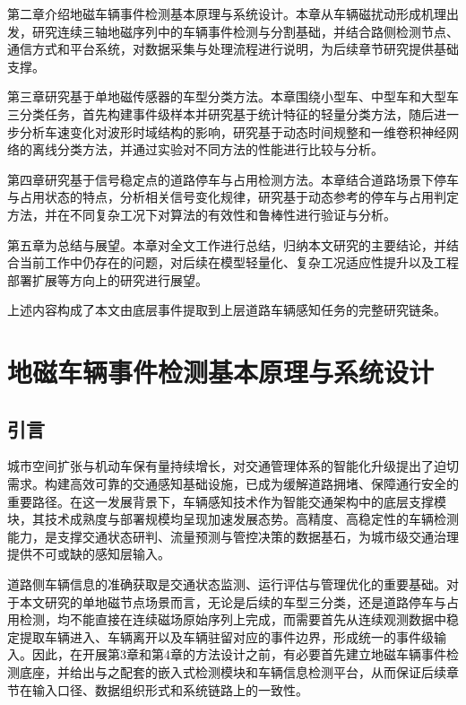 \documentclass{xdupgthesis}
\begin{document}
第二章介绍地磁车辆事件检测基本原理与系统设计。本章从车辆磁扰动形成机理出发，研究连续三轴地磁序列中的车辆事件检测与分割基础，并结合路侧检测节点、通信方式和平台系统，对数据采集与处理流程进行说明，为后续章节研究提供基础支撑。

第三章研究基于单地磁传感器的车型分类方法。本章围绕小型车、中型车和大型车三分类任务，首先构建事件级样本并研究基于统计特征的轻量分类方法，随后进一步分析车速变化对波形时域结构的影响，研究基于动态时间规整和一维卷积神经网络的离线分类方法，并通过实验对不同方法的性能进行比较与分析。

第四章研究基于信号稳定点的道路停车与占用检测方法。本章结合道路场景下停车与占用状态的特点，分析相关信号变化规律，研究基于动态参考的停车与占用判定方法，并在不同复杂工况下对算法的有效性和鲁棒性进行验证与分析。

第五章为总结与展望。本章对全文工作进行总结，归纳本文研究的主要结论，并结合当前工作中仍存在的问题，对后续在模型轻量化、复杂工况适应性提升以及工程部署扩展等方向上的研究进行展望。

上述内容构成了本文由底层事件提取到上层道路车辆感知任务的完整研究链条。








\chapter{地磁车辆事件检测基本原理与系统设计}
\label{ch:ch2_event_detect}

\section{引言}
\label{sec:ch2_intro}

城市空间扩张与机动车保有量持续增长，对交通管理体系的智能化升级提出了迫切需求。构建高效可靠的交通感知基础设施，已成为缓解道路拥堵、保障通行安全的重要路径。在这一发展背景下，车辆感知技术作为智能交通架构中的底层支撑模块，其技术成熟度与部署规模均呈现加速发展态势。高精度、高稳定性的车辆检测能力，是支撑交通状态研判、流量预测与管控决策的数据基石，为城市级交通治理提供不可或缺的感知层输入。

道路侧车辆信息的准确获取是交通状态监测、运行评估与管理优化的重要基础。对于本文研究的单地磁节点场景而言，无论是后续的车型三分类，还是道路停车与占用检测，均不能直接在连续磁场原始序列上完成，而需要首先从连续观测数据中稳定提取车辆进入、车辆离开以及车辆驻留对应的事件边界，形成统一的事件级输入。因此，在开展第3章和第4章的方法设计之前，有必要首先建立地磁车辆事件检测底座，并给出与之配套的嵌入式检测模块和车辆信息检测平台，从而保证后续章节在输入口径、数据组织形式和系统链路上的一致性。
\end{document}
